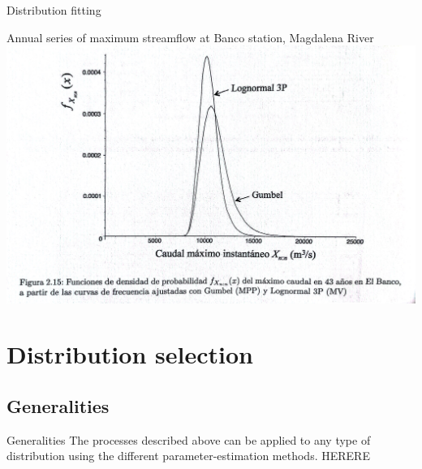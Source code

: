 \documentclass[8pt]{beamer}
\begin{document}
\begin{frame}{Distribution fitting}
  \begin{exampleblock}{Annual series of maximum streamflow at Banco station, Magdalena River} %
\centering
\includegraphics[width=1.0\linewidth]{fiM215.jpg}  %
 \end{exampleblock}
\end{frame}


\section{Distribution selection}
\subsection{Generalities}
\begin{frame}{Generalities}
    The processes described above can be applied to any type of distribution using the different parameter-estimation methods. HERERE
\end{frame}
\end{document}
